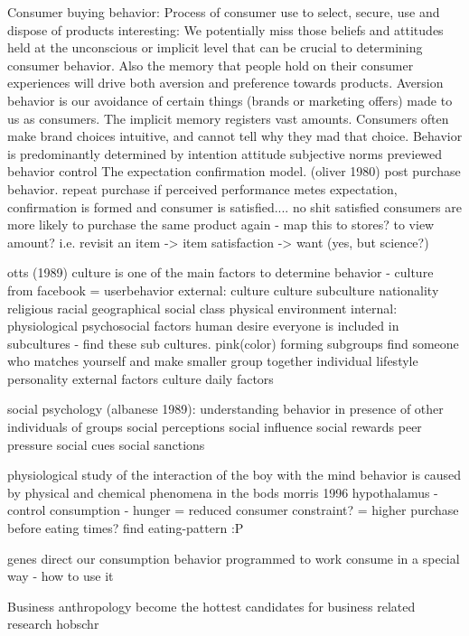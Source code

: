 Consumer buying behavior:
	Process of consumer use to select, secure, use and dispose of products
interesting: We potentially miss those beliefs and attitudes held at the unconscious or implicit level that can be crucial to determining consumer behavior. Also the memory that people hold on their consumer experiences will drive both aversion and preference towards products. Aversion behavior is our avoidance of certain things (brands or marketing offers) made to us as consumers.
	The implicit memory registers vast amounts. Consumers often make brand choices intuitive, and cannot tell why they mad that choice.
	Behavior is predominantly determined by intention
		attitude
		subjective norms
		previewed behavior control
	The expectation confirmation model. (oliver 1980)
		post purchase behavior.
		repeat purchase
		if perceived performance metes expectation, confirmation is formed and consumer
        is satisfied.... no shit
			satisfied consumers are more likely to purchase the same product again - map this to stores? to view amount? i.e. revisit an item -> item satisfaction -> want (yes, but science?)

otts (1989)
	culture is one of the main factors to determine behavior - culture from facebook = userbehavior
	external:
		culture
			culture
			subculture
				nationality
				religious
				racial
				geographical
			social class
		physical environment
	internal:
		physiological
		psychosocial factors
			human desire
	everyone is included in subcultures - find these sub cultures. pink(color)
	forming subgroups
		find someone who matches yourself and make smaller group together
	individual lifestyle
		personality
		external factors
			culture
			daily factors

social psychology (albanese 1989):
	understanding behavior in presence of other individuals of groups
	social perceptions
	social influence
	social rewards
	peer pressure
	social cues
	social sanctions

physiological
	study of the interaction of the boy with the mind
	behavior is caused by physical and chemical phenomena in the bods morris 1996
	hypothalamus - control consumption - hunger = reduced consumer constraint? = higher purchase before eating times? find eating-pattern :P

genes direct our consumption behavior
	programmed to work consume in a special way - how to use it

Business anthropology
	become the hottest candidates for business related research hobschr

